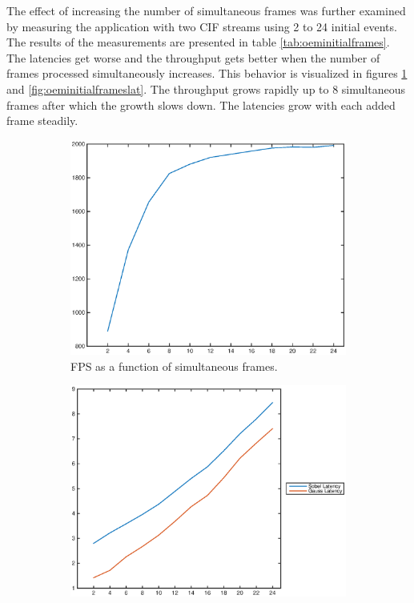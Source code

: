 The effect of increasing the number of simultaneous frames was further examined by measuring the application with two CIF streams using 2 to 24 initial events. The results of the measurements are presented in table \ref{tab:oeminitialframes}. The latencies get worse and the throughput gets better when the number of frames processed simultaneously increases. This behavior is visualized in figures \ref{fig:oeminitialframesfps} and \ref{fig:oeminitialframeslat}. The throughput grows rapidly up to 8 simultaneous frames after which the growth slows down. The latencies grow with each added frame steadily.
\begin{figure}
    \centering
    \begin{subfigure}[t]{0.49\textwidth}
        \centering
        \includegraphics[width=0.99\linewidth]{images/simultaneous_frames_fps.eps}
        \caption{FPS as a function of simultaneous frames.}
        \label{fig:oeminitialframesfps}
    \end{subfigure}
    \begin{subfigure}[t]{0.49\textwidth}
        \centering
        \includegraphics[width=0.99\linewidth]{images/simultaneous_frames_latency.eps}

\end{subfigure}
\end{figure}
